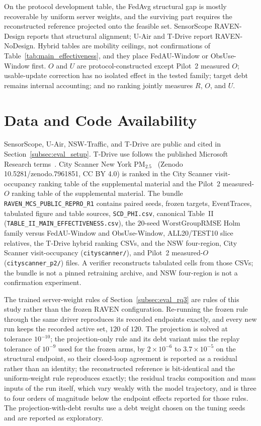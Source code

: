 \documentclass[letterpaper,journal]{IEEEtran}
\begin{document}
On the protocol development table, the FedAvg structural gap is mostly
recoverable by uniform server weights, and the surviving part requires the
reconstructed reference projected onto the feasible set.  SensorScope
RAVEN-Design reports that structural alignment; U-Air and T-Drive report
RAVEN-NoDesign.  Hybrid tables are mobility ceilings, not confirmations of
Table~\ref{tab:main_effectiveness}, and they place FedAU-Window or ObsUse-Window
first.  $O$ and $U$ are protocol-constructed except Pilot~2 measured $O$;
usable-update correction has no isolated effect in the tested family; target debt
remains internal accounting; and no ranking jointly measures $R$, $O$, and $U$.

\section*{Data and Code Availability}
SensorScope, U-Air, NSW-Traffic, and T-Drive are public and cited in
Section~\ref{subsec:eval_setup}.  T-Drive use follows the published
Microsoft Research terms~\cite{yuan2010tdrive}.
City Scanner New York {PM}$_{2.5}$~\cite{wang2023cityscanner}
(Zenodo 10.5281/zenodo.7961851, CC BY 4.0) is ranked in
the City Scanner visit-occupancy ranking table of the supplemental material and
the Pilot~2 measured-$O$ ranking table of the supplemental material.
The bundle \texttt{RAVEN\_MCS\_PUBLIC\_REPRO\_R1} contains paired seeds,
frozen targets, EventTraces, tabulated figure and table sources,
\texttt{SCD\_PHI.csv}, canonical Table~II
(\texttt{TABLE\_II\_MAIN\_EFFECTIVENESS.csv}),
the $20$-seed $\mathrm{WorstGroupRMSE}$ Holm family versus FedAU-Window and
ObsUse-Window, ALL20/TEST10 slice relatives, the T-Drive hybrid ranking CSVs,
and the NSW four-region, City Scanner visit-occupancy
(\texttt{cityscanner/}), and Pilot~2 measured-$O$ (\texttt{cityscanner\_p2/})
files.  A verifier reconstructs tabulated cells from those CSVs; the bundle is
not a pinned retraining archive, and NSW four-region is not a confirmation
experiment.

The trained server-weight rules of Section~\ref{subsec:eval_rq3} are rules of
this study rather than the frozen RAVEN configuration.  Re-running the frozen
rule through the same driver reproduces its recorded endpoints exactly, and every
new run keeps the recorded active set, $120$ of $120$.  The projection is solved
at tolerance $10^{-10}$; the projection-only rule and its debt variant miss the
replay tolerance of $10^{-9}$ used for the frozen arms, by $2\times10^{-6}$ to
$3.7\times10^{-5}$ on the structural endpoint, so their closed-loop agreement is
reported as a residual rather than an identity; the reconstructed reference is
bit-identical and the uniform-weight rule reproduces exactly; the residual tracks
composition and mass inputs of the run itself, which vary weakly with the model
trajectory, and is three to four orders of magnitude below the endpoint effects
reported for those rules.  The projection-with-debt results use a debt weight
chosen on the tuning seeds and are reported as exploratory.



\end{document}
